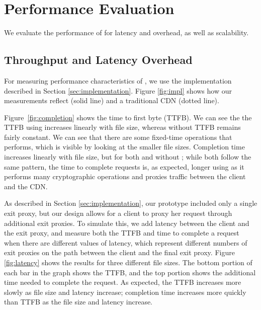 

\section{Performance Evaluation}
\label{sec:performance}
We evaluate the performance 
of \system{} for latency and overhead, as well as scalability.  %

\subsection{Throughput and Latency Overhead}
For measuring performance characteristics of \system{}, we use the implementation 
described in Section \ref{sec:implementation}.  Figure \ref{fig:impl} shows 
how our measurements reflect \system{} (solid line) and a traditional CDN (dotted 
line).  

Figure~\ref{fig:completion} shows the time to first byte (TTFB).  We can see the the TTFB using \system{} increases linearly with
file size, whereas without \system{} TTFB remains fairly constant.  We can see that there are some fixed-time operations that \system{} performs, which
is visible by looking at the smaller file sizes. Completion time increases linearly
with file size, but for both \system{} and without \system{}; while both follow the
same pattern, the time to complete requests is, as expected, longer using \system{} as it performs many cryptographic operations and proxies traffic between the client and the CDN.



As described in Section \ref{sec:implementation}, our prototype included only a single exit proxy, but 
our design allows for a client to proxy her request through additional exit proxies.  To simulate this, we 
add latency between the client and the exit proxy, and measure both the TTFB and time to complete a request 
when there are different values of latency, which represent different numbers of exit proxies on the path between the 
client and the final exit proxy.  Figure \ref{fig:latency} shows the results for three different file sizes. The 
bottom portion of each bar in the graph shows the TTFB, and the top portion shows the additional time needed 
to complete the request.  As expected, the TTFB increases more slowly as file size
and latency increase; completion time
increases more quickly than TTFB as the file size and latency increase.   

